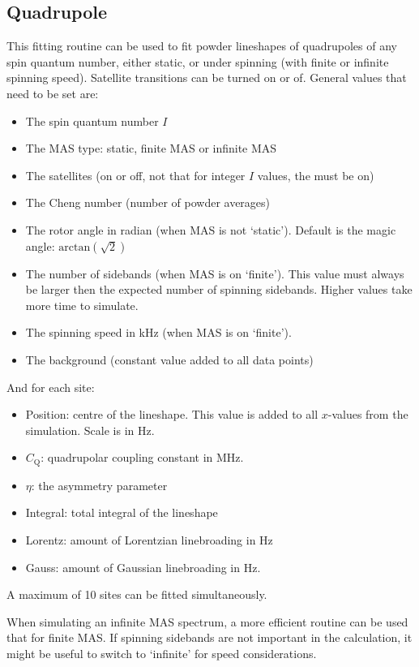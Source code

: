\documentclass[11pt,a4paper]{article}
\begin{document}
\subsection{Quadrupole}
This fitting routine can be used to fit powder lineshapes of quadrupoles of any spin quantum number,
either static, or under spinning (with finite or infinite spinning speed). Satellite transitions can
be turned on or of. General values that need to be set are:
\begin{itemize}
\item The spin quantum number $I$ 
\item The MAS type: static, finite MAS or infinite MAS
\item The satellites (on or off, not that for integer $I$ values, the must be on)
\item The Cheng number (number of powder averages)
\item The rotor angle in radian (when MAS is not `static'). Default is the magic angle:
	 $\text{arctan}(\sqrt{2})$
\item The number of sidebands (when MAS is on `finite'). This value must always be larger then the
  expected number of spinning sidebands. Higher values take more time to simulate.
\item The spinning speed in kHz (when MAS is on `finite').
\item The background (constant value added to all data points)
\end{itemize}
And for each site:
\begin{itemize}
\item Position: centre of the lineshape. This value is added to all $x$-values from the simulation. Scale is in Hz.
\item $C_\text{Q}$: quadrupolar coupling constant in MHz.
\item $\eta$: the asymmetry parameter
\item Integral: total integral of the lineshape
\item Lorentz: amount of Lorentzian linebroading in Hz
\item Gauss: amount of Gaussian linebroading in Hz.
\end{itemize}
A maximum of 10 sites can be fitted simultaneously.

When simulating an infinite MAS spectrum, a more efficient routine can be used that for finite MAS.
If spinning sidebands are not important in the calculation, it might be useful to switch to
`infinite' for speed considerations.
\end{document}
